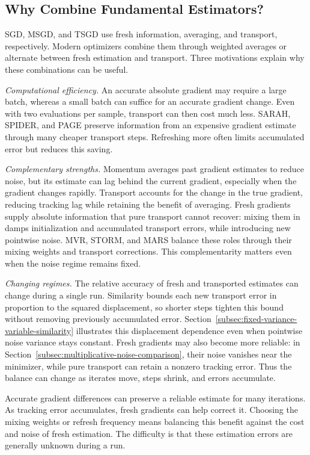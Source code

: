 \subsection{Why Combine Fundamental Estimators?}
\label{subsec:why-combine-estimators}

SGD, MSGD, and TSGD use fresh information, averaging, and transport,
respectively. Modern optimizers combine them through weighted averages
or alternate between fresh estimation and transport. Three motivations
explain why these combinations can be useful.

\emph{Computational efficiency.} An accurate absolute gradient may
require a large batch, whereas a small batch can suffice for an accurate
gradient change. Even with two evaluations per sample, transport can
then cost much less. SARAH, SPIDER, and PAGE preserve information from
an expensive gradient estimate through many cheaper transport steps.
Refreshing more often limits accumulated error but reduces this saving.

\emph{Complementary strengths.} Momentum averages past gradient
estimates to reduce noise, but its estimate can lag behind the current
gradient, especially when the gradient changes rapidly. Transport
accounts for the change in the true gradient, reducing tracking lag while retaining the benefit
of averaging. Fresh gradients supply absolute information that pure
transport cannot recover: mixing them in damps initialization and
accumulated transport errors, while introducing new pointwise noise.
MVR, STORM, and MARS balance these roles through their mixing weights
and transport corrections. This complementarity matters even when
the noise regime remains fixed.

\emph{Changing regimes.} The relative accuracy of fresh and transported
estimates can change during a single run. Similarity bounds each new
transport error in proportion to the squared displacement, so shorter
steps tighten this bound without removing previously accumulated error.
Section~\ref{subsec:fixed-variance-variable-similarity} illustrates
this displacement dependence even when pointwise noise variance stays
constant. Fresh gradients may also become more reliable: in
Section~\ref{subsec:multiplicative-noise-comparison}, their noise
vanishes near the minimizer, while pure transport can retain a nonzero
tracking error. Thus the balance can change as iterates move, steps
shrink, and errors accumulate.

Accurate gradient differences can preserve a reliable estimate for many
iterations. As tracking error accumulates, fresh gradients can help
correct it. Choosing the mixing weights or refresh frequency means
balancing this benefit against the cost and noise of fresh estimation.
The difficulty is that these estimation errors are generally unknown
during a run.

